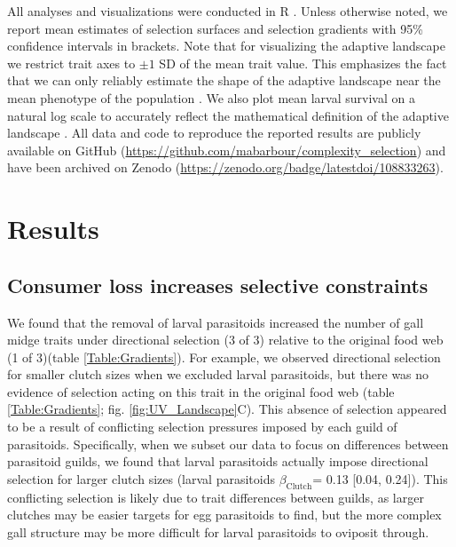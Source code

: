 \documentclass[11pt,]{article}
\begin{document}
All analyses and visualizations were conducted in R \citep{R2018}.
Unless otherwise noted, we report mean estimates of selection surfaces
and selection gradients with 95\% confidence intervals in brackets. Note
that for visualizing the adaptive landscape we restrict trait axes to
\(\pm 1\) SD of the mean trait value. This emphasizes the fact that we
can only reliably estimate the shape of the adaptive landscape near the
mean phenotype of the population \citep{Arnold2001}. We also plot mean
larval survival on a natural log scale to accurately reflect the
mathematical definition of the adaptive landscape \citep{Arnold2003}.
All data and code to reproduce the reported results are publicly
available on GitHub
(\url{https://github.com/mabarbour/complexity_selection}) and have been
archived on Zenodo (\url{https://zenodo.org/badge/latestdoi/108833263}).

\section{Results}\label{results}

\subsection{Consumer loss increases selective
constraints}\label{consumer-loss-increases-selective-constraints}

\indent We found that the removal of larval parasitoids increased the
number of gall midge traits under directional selection (3 of 3)
relative to the original food web (1 of 3)(table \ref{Table:Gradients}).
For example, we observed directional selection for smaller clutch sizes
when we excluded larval parasitoids, but there was no evidence of
selection acting on this trait in the original food web (table
\ref{Table:Gradients}; fig. \ref{fig:UV_Landscape}C). This absence of
selection appeared to be a result of conflicting selection pressures
imposed by each guild of parasitoids. Specifically, when we subset our
data to focus on differences between parasitoid guilds, we found that
larval parasitoids actually impose directional selection for larger
clutch sizes (larval parasitoids \(\beta_{\text{Clutch}}\)= 0.13
{[}0.04, 0.24{]}). This conflicting selection is likely due to trait
differences between guilds, as larger clutches may be easier targets for
egg parasitoids to find, but the more complex gall structure may be more
difficult for larval parasitoids to oviposit through.

\bigskip
\end{document}

